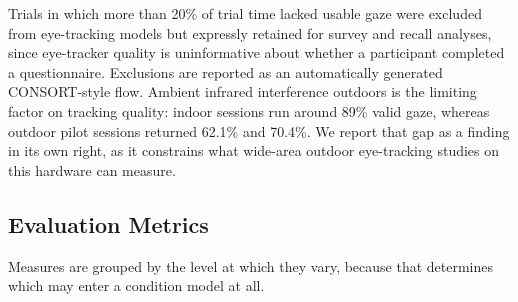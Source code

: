 Trials in which more than 20\% of trial time lacked usable gaze were excluded
from eye-tracking models but expressly retained for survey and recall
analyses, since eye-tracker quality is uninformative about whether a
participant completed a questionnaire. Exclusions are reported as an
automatically generated CONSORT-style flow. Ambient infrared interference
outdoors is the limiting factor on tracking quality: indoor sessions run
around 89\% valid gaze, whereas outdoor pilot sessions returned 62.1\% and
70.4\%. We report that gap as a finding in its own right, as it constrains
what wide-area outdoor eye-tracking studies on this hardware can measure.

\subsection{Evaluation Metrics}
\label{sec:metrics}

Measures are grouped by the level at which they vary, because that determines
which may enter a condition model at all.

